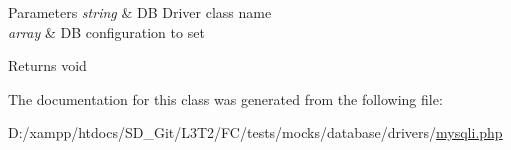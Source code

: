 \begin{DoxyParams}{Parameters}
{\em string} & D\+B Driver class name \\
\hline
{\em array} & D\+B configuration to set \\
\hline
\end{DoxyParams}
\begin{DoxyReturn}{Returns}
void 
\end{DoxyReturn}


The documentation for this class was generated from the following file\+:\begin{DoxyCompactItemize}
\item 
D\+:/xampp/htdocs/\+S\+D\+\_\+\+Git/\+L3\+T2/\+F\+C/tests/mocks/database/drivers/\hyperlink{drivers_2mysqli_8php}{mysqli.\+php}\end{DoxyCompactItemize}
